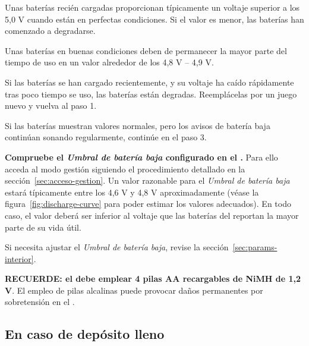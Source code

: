 \begin{enumeratecompact}
\begin{itemizecompact}

\item Unas baterías recién cargadas proporcionan típicamente un voltaje superior a los 5,0 V cuando están en perfectas condiciones. Si el valor es menor, las baterías han comenzado a degradarse.

\item Unas baterías en buenas condiciones deben de permanecer la mayor parte del tiempo de uso en un valor alrededor de los 4,8 V -- 4,9 V.

\item Si las baterías se han cargado recientemente, y su voltaje ha caído rápidamente tras poco tiempo se uso, las baterías están degradas. Reemplácelas por un juego nuevo y vuelva al paso 1.

\item Si las baterías muestran valores normales, pero los avisos de batería baja continúan sonando regularmente, continúe en el paso 3.

\end{itemizecompact}

\item \textbf{Compruebe el \emph{Umbral de batería baja} configurado en el \MIE.} Para ello acceda al modo gestión siguiendo el procedimiento detallado en la sección~\ref{sec:acceso-gestion}. Un valor razonable para el \emph{Umbral de batería baja} estará típicamente entre los 4,6 V y 4,8 V aproximadamente (véase la figura~\ref{fig:discharge-curve} para poder estimar los valores adecuados). En todo caso, el valor deberá ser inferior al voltaje que las baterías del \ME reportan la mayor parte de su vida útil.

\begin{itemizecompact}

\item Si necesita ajustar el \emph{Umbral de batería baja}, revise la sección~\ref{sec:params-interior}.

\end{itemizecompact}

\end{enumeratecompact}



\textbf{RECUERDE: el \MEE debe emplear 4 pilas AA recargables de NiMH de 1,2 V}. El empleo de pilas alcalinas puede provocar daños permanentes por sobretensión en el \ME. 
\importantend


\subsection{En caso de depósito lleno}
\label{sec:deposito-lleno}

